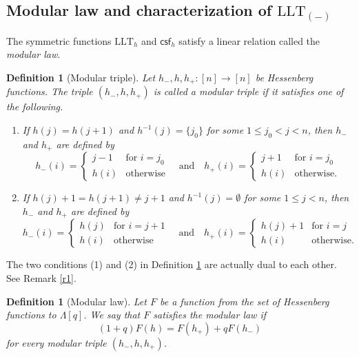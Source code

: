 \documentclass[11pt]{article}
\newtheorem{definition}[theo]{Definition}
\theoremstyle{definition}
\numberwithin{equation}{section}
\numberwithin{equation}{section}
\newcommand{\aand}{\quad\text{and}\quad}
\newcommand\beq{\begin{equation}}
\newcommand\eeq{\end{equation}}
\newcommand\csf{\mathsf{csf}}
\newcommand\LLT{\mathrm{LLT}}
\begin{document}
\subsection{Modular law and characterization of \texorpdfstring{$\LLT_{(-)}$}{LLT(-)}}

The symmetric functions $\LLT_h$ and $\csf_h$ satisfy a linear relation called the \emph{modular law}.
\begin{definition}[Modular triple] \label{59} Let $h_-,h,h_+:[n]\to[n]$ be Hessenberg functions.
	The triple $(h_-,h,h_+)$ is called a \emph{modular triple} if it satisfies one of the following. 
		\begin{enumerate}
			\item If $h(j)=h(j+1)$ and $h^{-1}(j)=\{j_0\}$ for some $1\leq j_0<j<n$, then $h_-$ and $h_+$ are defined by 
			\[h_-(i)=\begin{cases}
				j-1 & \text{for }i=j_0\\
				h(i) &\text{otherwise}
				\end{cases}
			\aand h_+(i)=\begin{cases}
				j+1 &\text{for }i=j_0\\
				h(i) & \text{otherwise.}
				\end{cases} 
			\]
			\item If $h(j)+1=h(j+1)\neq j+1$ and $h^{-1}(j)=\emptyset$ for some $1\leq j<n$, then $h_-$ and $h_+$ are defined by 
			\[h_-(i)=\begin{cases}
				h(j) &\text{for }i=j+1\\
				h(i) &\text{otherwise}
				\end{cases}  
			\aand h_+(i)=\begin{cases}
				h(j)+1 &\text{for }i= j\\
				h(i) &\text{otherwise.}
				\end{cases}
			\]
		\end{enumerate}
\end{definition}

The two conditions (1) and (2) in Definition \ref{59} are actually dual to each other. See Remark \ref{r1}. 

\begin{definition}[Modular law] \label{n42}
Let $F$ be a function from the set of Hessenberg functions to $\Lambda[q]$. We say that $F$ satisfies the \emph{modular law} if
	\beq \label{5} (1+q)F(h)=F(h_+)+qF(h_-)\eeq
	for every modular triple $(h_-,h,h_+)$. 
\end{definition}
\end{document}

